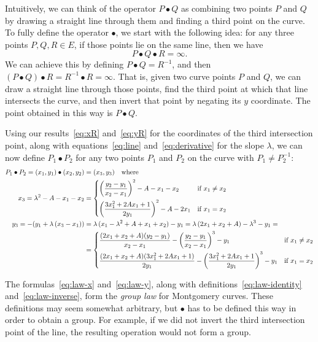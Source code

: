 \documentclass[manuscript]{acmart}
\begin{document}
Intuitively, we can think of the operator $P \bullet Q$ as combining two points $P$ and $Q$ by drawing a straight line through them and finding a third point on the curve.
To fully define the operator $\bullet$, we start with the following idea: for any three points $P, Q, R \in E$, if those points lie on the same line, then we have
\begin{equation}
P \bullet Q \bullet R = \infty.
\end{equation}
We can achieve this by defining $P \bullet Q = R^{-1}$, and then $(P \bullet Q) \bullet R = R^{-1} \bullet R = \infty$.
That is, given two curve points $P$ and $Q$, we can draw a straight line through those points, find the third point at which that line intersects the curve, and then invert that point by negating its $y$ coordinate.
The point obtained in this way is $P \bullet Q$.

Using our results~\eqref{eq:xR} and~\eqref{eq:yR} for the coordinates of the third intersection point, along with equations~\eqref{eq:line} and~\eqref{eq:derivative} for the slope $\lambda$, we can now define $P_1 \bullet P_2$ for any two points $P_1$ and $P_2$ on the curve with $P_1 \neq P_2^{-1}$:
\begin{align}
P_1 \bullet P_2 = (x_1, y_1) \bullet (x_2, y_2) &= (x_3, y_3) \quad\text{where}\nonumber\\
x_3 = \lambda^2 - A - x_1 - x_2 &= \begin{dcases}
\left(\frac{y_2 - y_1}{x_2 - x_1}\right)^2 - A - x_1 - x_2 & \text{if } x_1 \neq x_2 \\
\left(\frac{3x_1^2 + 2Ax_1 + 1}{2y_1}\right)^2 - A - 2x_1 & \text{if } x_1 = x_2
\end{dcases}\label{eq:law-x}\\
y_3 = -(y_1 + \lambda\,(x_3 - x_1)) &= \lambda\,(x_1 - \lambda^2 + A + x_1 + x_2) - y_1 =
\lambda\,(2x_1 + x_2 + A) - \lambda^3 - y_1 =\label{eq:law-y}\\
&= \begin{dcases}
\frac{(2x_1 + x_2 + A) (y_2 - y_1)}{x_2 - x_1} - \left(\frac{y_2 - y_1}{x_2 - x_1}\right)^3 - y_1 & \text{if } x_1 \neq x_2 \\
\frac{(2x_1 + x_2 + A) (3x_1^2 + 2Ax_1 + 1)}{2y_1} - \left(\frac{3x_1^2 + 2Ax_1 + 1}{2y_1}\right)^3 - y_1 & \text{if } x_1 = x_2
\end{dcases}\nonumber
\end{align}

The formulas~\eqref{eq:law-x} and~\eqref{eq:law-y}, along with definitions~\eqref{eq:law-identity} and~\eqref{eq:law-inverse}, form the \emph{group law} for Montgomery curves.
These definitions may seem somewhat arbitrary, but $\bullet$ has to be defined this way in order to obtain a group.
For example, if we did not invert the third intersection point of the line, the resulting operation would not form a group.
\end{document}
